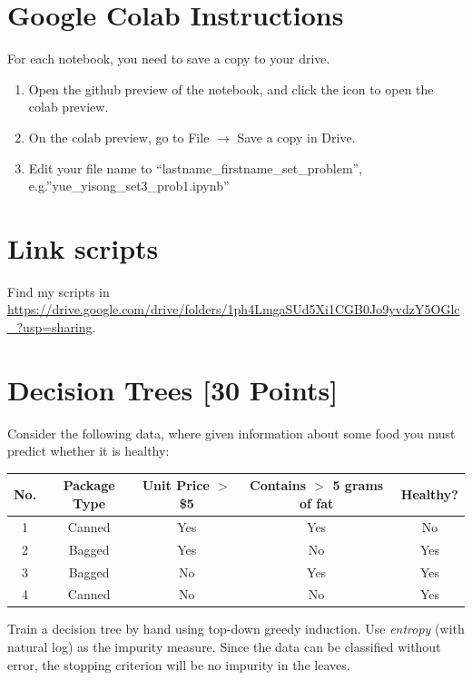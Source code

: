\documentclass{article}
\begin{document}
\section*{Google Colab Instructions}
For each notebook, you need to save a copy to your drive.
\begin{enumerate}
        \item Open the github preview of the notebook, and click the icon to open the colab preview.
        \item On the colab preview, go to File $\rightarrow$ Save a copy in Drive.
        \item Edit your file name to “lastname_firstname_set_problem”, e.g.”yue_yisong_set3_prob1.ipynb”
\end{enumerate}

\section*{Link scripts}
Find my scripts in \url{https://drive.google.com/drive/folders/1ph4LmgaSUd5Xi1CGB0Jo9yvdzY5OGlc_?usp=sharing}.






\newpage
\section{Decision Trees [30 Points]}

\problem[7]
Consider the following data, where given information about some food you must predict whether it is healthy:

\begin{table}[ht]
\centering
\begin{tabular}{c | c c c | c}
\hline
No. & Package Type & Unit Price $>$ \$5 & Contains $>$ 5 grams of fat & Healthy? \\ [0.5ex]
\hline
1 & Canned & Yes & Yes & No  \\
2 & Bagged & Yes & No  & Yes \\
3 & Bagged & No  & Yes & Yes \\
4 & Canned & No  & No  & Yes \\ [1ex]
\hline
\end{tabular}
\end{table}

Train a decision tree by hand using top-down greedy induction. Use \emph{entropy} (with natural log) as the impurity measure.  Since the data can be classified
without error, the stopping criterion will be no impurity in the leaves.
\end{document}
